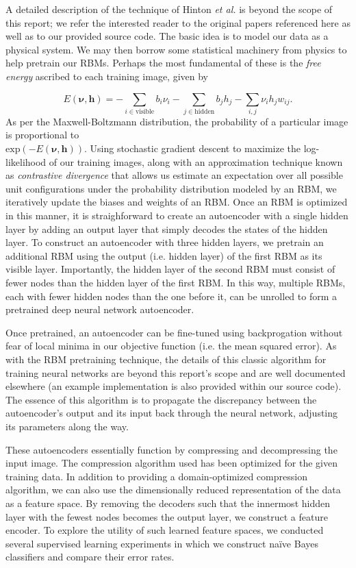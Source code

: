 \documentclass{article}
\begin{document}
A detailed description of the technique of Hinton {\em et al.} is beyond the
scope of this report; we refer the interested reader to the original papers
referenced here as well as to our provided source code. The basic idea is to
model our data as a physical system. We may then borrow some statistical
machinery from physics to help pretrain our RBMs. Perhaps the most fundamental
of these is the {\em free energy} ascribed to each training image, given by

\begin{equation}
E(\boldsymbol{\nu}, \mathbf{h}) = -\sum_{i\in\mathrm{visible}}{b_i\nu_i} - \sum_{j\in\mathrm{hidden}}{b_jh_j - \sum_{i,j}{\nu_ih_jw_{ij}}}.
\end{equation}
As per the Maxwell-Boltzmann distribution, the probability of a particular image
is proportional to\\$\mathrm{exp}\left(-E(\boldsymbol{\nu}, \mathbf{h})\right)$. Using
stochastic gradient descent to maximize the log-likelihood of our training
images, along with an approximation technique known as {\em contrastive divergence}
that allows us estimate an expectation over all possible unit
configurations under the probability distribution modeled by an RBM, we
iteratively update the biases and weights of an RBM. Once an RBM is optimized in
this manner, it is straighforward to create an autoencoder with a single hidden
layer by adding an output layer that simply decodes the states of the hidden
layer. To construct an autoencoder with three hidden layers, we pretrain an
additional RBM using the output (i.e. hidden layer) of the first RBM as its
visible layer. Importantly, the hidden layer of the second RBM must consist of
fewer nodes than the hidden layer of the first RBM. In this way, multiple RBMs,
each with fewer hidden nodes than the one before it, can be unrolled to form a
pretrained deep neural network autoencoder.

Once pretrained, an autoencoder can be fine-tuned using backprogation without
fear of local minima in our objective function (i.e. the mean squared error). As
with the RBM pretraining technique, the details of this classic algorithm for
training neural networks are beyond this report's scope and are well documented
elsewhere (an example implementation is also provided within our source code).
The essence of this algorithm is to propagate the discrepancy between the
autoencoder's output and its input back through the neural network, adjusting
its parameters along the way.

These autoencoders essentially function by compressing and decompressing the
input image. The compression algorithm used has been optimized for the given
training data. In addition to providing a domain-optimized compression
algorithm, we can also use the dimensionally reduced representation of the data
as a feature space. By removing the decoders such that the innermost hidden
layer with the fewest nodes becomes the output layer, we construct a feature
encoder. To explore the utility of such learned feature spaces, we conducted
several supervised learning experiments in which we construct na\"{i}ve Bayes
classifiers and compare their error rates.
\end{document}
